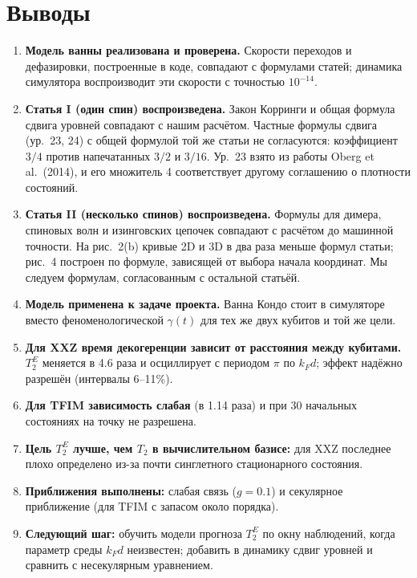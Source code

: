 \section{Выводы}
\label{sec:kondo_conclusions}
\begin{enumerate}
\item \textbf{Модель ванны реализована и проверена.} Скорости переходов и
  дефазировки, построенные в коде, совпадают с формулами статей; динамика
  симулятора воспроизводит эти скорости с точностью $10^{-14}$.
\item \textbf{Статья I (один спин) воспроизведена.} Закон Корринги и общая
  формула сдвига уровней совпадают с нашим расчётом. Частные формулы сдвига
  (ур.~23, 24) с общей формулой той же статьи не согласуются: коэффициент
  $3/4$ против напечатанных $3/2$ и $3/16$. Ур.~23 взято из работы Oberg
  et al.\ (2014), и его множитель 4 соответствует другому соглашению о
  плотности состояний.
\item \textbf{Статья II (несколько спинов) воспроизведена.} Формулы для
  димера, спиновых волн и изинговских цепочек совпадают с расчётом до
  машинной точности. На рис.~2(b) кривые 2D и 3D в два раза меньше формул
  статьи; рис.~4 построен по формуле, зависящей от выбора начала координат.
  Мы следуем формулам, согласованным с остальной статьёй.
\item \textbf{Модель применена к задаче проекта.} Ванна Кондо стоит в
  симуляторе вместо феноменологической $\gamma(t)$ для тех же двух кубитов
  и той же цели.
\item \textbf{Для XXZ время декогеренции зависит от расстояния между
  кубитами.} $T_2^E$ меняется в 4.6 раза и осциллирует с периодом $\pi$ по
  $k_Fd$; эффект надёжно разрешён (интервалы 6--11\%).
\item \textbf{Для TFIM зависимость слабая} (в 1.14 раза) и при 30
  начальных состояниях на точку не разрешена.
\item \textbf{Цель $T_2^E$ лучше, чем $T_2$ в вычислительном базисе:} для
  XXZ последнее плохо определено из-за почти синглетного стационарного
  состояния.
\item \textbf{Приближения выполнены:} слабая связь ($g=0.1$) и секулярное
  приближение (для TFIM с запасом около порядка).
\item \textbf{Следующий шаг:} обучить модели прогноза $T_2^E$ по окну
  наблюдений, когда параметр среды $k_Fd$ неизвестен; добавить в динамику
  сдвиг уровней и сравнить с несекулярным уравнением.
\end{enumerate}
